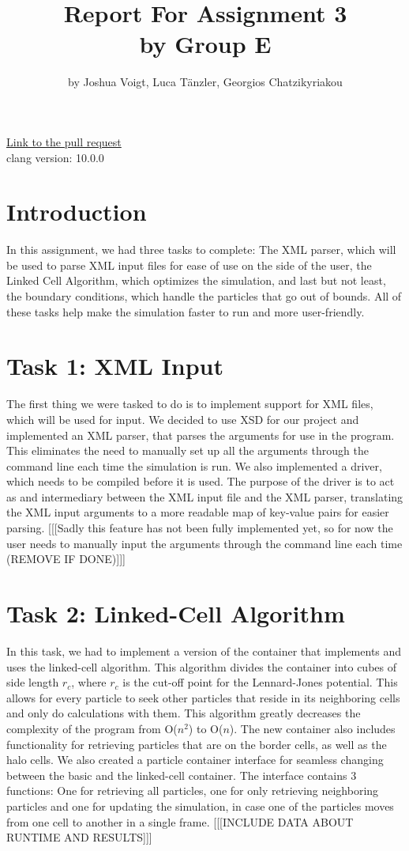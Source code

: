 \documentclass{article}
\title{Report For Assignment 3 \\
\large by Group E}
\author{by Joshua Voigt, Luca Tänzler, Georgios Chatzikyriakou}
\begin{document}
\maketitle

\centering \large \href{;INSERT LINK}{Link to the pull request}\\
clang version: 10.0.0

\raggedright
\section{Introduction}
In this assignment, we had three tasks to complete: The XML parser, which will be used to parse XML input files for ease of use on the side of the user, the Linked Cell Algorithm, which optimizes the simulation, and last but not least, the boundary conditions, which handle the particles that go out of bounds. All of these tasks help make the simulation faster to run and more user-friendly.

\section{Task 1: XML Input}
The first thing we were tasked to do is to implement support for XML files, which will be used for input. We decided to use XSD for our project and implemented an XML parser, that parses the arguments for use in the program. This eliminates the need to manually set up all the arguments through the command line each time the simulation is run. We also implemented a driver, which needs to be compiled before it is used. The purpose of the driver is to act as and intermediary between the XML input file and the XML parser, translating the XML input arguments to a more readable map of key-value pairs for easier parsing. [[[Sadly this feature has not been fully implemented yet, so for now the user needs to manually input the arguments through the command line each time (REMOVE IF DONE)]]]


\section{Task 2: Linked-Cell Algorithm}
In this task, we had to implement a version of the container that implements and uses the linked-cell algorithm. This algorithm divides the container into cubes of side length $r_c$, where $r_c$ is the cut-off point for the Lennard-Jones potential. This allows for every particle to seek other particles that reside in its neighboring cells and only do calculations with them. This algorithm greatly decreases the complexity of the program from O($n^2$) to O($n$). The new container also includes functionality for retrieving particles that are on the border cells, as well as the halo cells. We also created a particle container interface for seamless changing between the basic and the linked-cell container. The interface contains 3 functions: One for retrieving all particles, one for only retrieving neighboring particles and one for updating the simulation, in case one of the particles moves from one cell to another in a single frame. [[[INCLUDE DATA ABOUT RUNTIME AND RESULTS]]]
\end{document}

